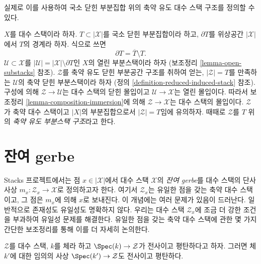 \noindent
실제로 이를 사용하여 국소 닫힌 부분집합 위의 축약 유도 대수 스택 구조를
정의할 수 있다.

\begin{remark}
\label{remark-stack-structure-locally-closed-subset}
$X$를 대수 스택이라 하자. $T \subset |\mathcal{X}|$를 국소 닫힌
부분집합이라 하고, $\partial T$를 위상공간 $|\mathcal{X}|$에서
$T$의 경계라 하자. 식으로 쓰면
$$
\partial T = \overline{T} \setminus T.
$$
$\mathcal{U} \subset \mathcal{X}$를
$|\mathcal{U}| = |\mathcal{X}| \setminus \partial T$인 $X$의 열린 부분스택이라 하자
(보조정리 \ref{lemma-open-substacks} 참조).
$\mathcal{Z}$를 축약 유도 닫힌 부분공간 구조를 취하여 얻는,
$|\mathcal{Z}| = T$를 만족하는 $\mathcal{U}$의 축약 닫힌 부분스택이라 하자
(정의 \ref{definition-reduced-induced-stack} 참조).
구성에 의해 $\mathcal{Z} \to \mathcal{U}$는 대수 스택의 닫힌 몰입이고
$\mathcal{U} \to \mathcal{X}$는 열린 몰입이다. 따라서 보조정리
\ref{lemma-composition-immersion}에 의해
$\mathcal{Z} \to \mathcal{X}$는 대수 스택의 몰입이다.
$\mathcal{Z}$가 축약 대수 스택이고 $|X|$의 부분집합으로서
$|\mathcal{Z}| = T$임에 유의하자. 때때로 $\mathcal{Z}$를
$T$ 위의 {\it 축약 유도 부분스택 구조}라고 한다.
\end{remark}













\section{잔여 gerbe}
\label{section-residual-gerbe}

\noindent
Stacks 프로젝트에서는 점 $x \in |\mathcal{X}|$에서 대수 스택
$\mathcal{X}$의 {\it 잔여 gerbe}를 대수 스택의 단사사상
$m_x : \mathcal{Z}_x \to \mathcal{X}$로 정의하고자 한다. 여기서
$\mathcal{Z}_x$는 유일한 점을 갖는 축약 대수 스택이고, 그 점은
$m_x$에 의해 $x$로 보내진다. 이 개념에는 여러 문제가 있음이 드러난다.
일반적으로 존재성도 유일성도 명확하지 않다. 우리는 대수 스택
$\mathcal{Z}_x$에 조금 더 강한 조건을 부과하여 유일성 문제를 해결한다.
유일한 점을 갖는 축약 대수 스택에 관한 몇 가지 간단한 보조정리를 통해
이를 더 자세히 논의한다.

\begin{lemma}
\label{lemma-flat-cover-by-field}
$\mathcal{Z}$를 대수 스택, $k$를 체라 하고
$\Spec(k) \to \mathcal{Z}$가 전사이고 평탄하다고 하자. 그러면 체 $k'$에 대한
임의의 사상 $\Spec(k') \to \mathcal{Z}$도 전사이고 평탄하다.
\end{lemma}

